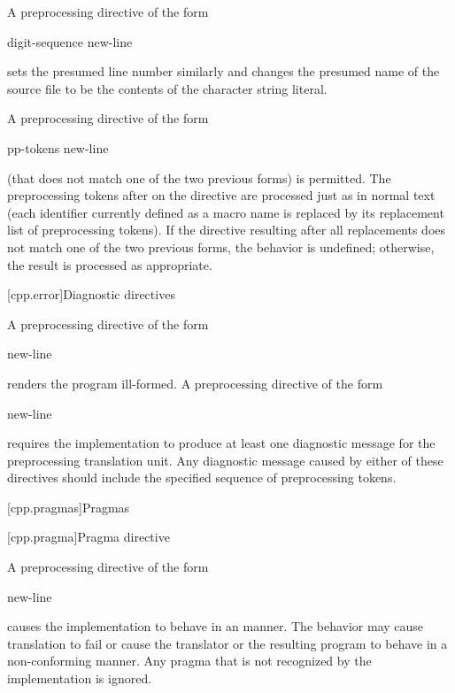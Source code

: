 \pnum
A preprocessing directive of the form
\begin{ncsimplebnf}
 digit-sequence    new-line
\end{ncsimplebnf}
sets the presumed line number similarly and changes the
presumed name of the source file to be the contents
of the character string literal.

\pnum
A preprocessing directive of the form
\begin{ncsimplebnf}
 pp-tokens new-line
\end{ncsimplebnf}
(that does not match one of the two previous forms)
is permitted.
The preprocessing tokens after
on the directive are processed just as in normal text
(each identifier currently defined as a macro name is replaced by its
replacement list of preprocessing tokens).
If the directive resulting after all replacements does not match
one of the two previous forms, the behavior is undefined;
otherwise, the result is processed as appropriate.

[cpp.error]{Diagnostic directives}%
%
%
%

\pnum
A preprocessing directive of the form
\begin{ncsimplebnf}
  new-line
\end{ncsimplebnf}
renders the program ill-formed.
A preprocessing directive of the form
\begin{ncsimplebnf}
  new-line
\end{ncsimplebnf}
requires the implementation to produce at least one diagnostic message
for the preprocessing translation unit.
\recommended
Any diagnostic message caused by either of these directives
should include the specified sequence of preprocessing tokens.

[cpp.pragmas]{Pragmas}%

[cpp.pragma]{Pragma directive}%
%

\pnum
A preprocessing directive of the form
\begin{ncsimplebnf}
  new-line
\end{ncsimplebnf}
causes the implementation to behave
in an  manner.
The behavior may cause translation to fail or cause the translator or
the resulting program to behave in a non-conforming manner.
Any pragma that is not recognized by the implementation is ignored.


